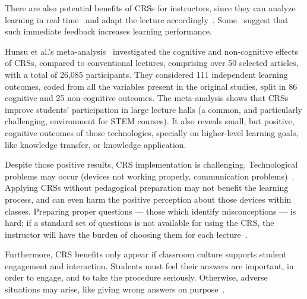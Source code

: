 There are also potential benefits of CRSs for instructors, since they can analyze learning in real time~\cite{yourstone2008classroom} and adapt the lecture accordingly~\cite{caldwell2007clickers, cutts2006practical}. Some~\cite{yourstone2008classroom, caldwell2007clickers} suggest that such immediate feedback increases learning performance.

Hunsu et al.'s meta-analysis~\cite{hunsu2016ARSeffect} investigated the cognitive and non-cognitive effects of CRSs, compared to conventional lectures, comprising over 50 selected articles, with a total of 26,085 participants. They considered 111 independent learning outcomes, coded from all the variables present in the original studies, split in 86 cognitive and 25 non-cognitive outcomes. The meta-analysis shows that CRSs improve students' participation in large lecture halls (a common, and particularly challenging, environment for STEM courses). It also reveals small, but positive, cognitive outcomes of those technologies, specially on higher-level learning goals, like knowledge transfer, or knowledge application.

Despite those positive results, CRS implementation is challenging. Technological problems may occur (devices not working properly, communication problems)~\cite{siau2006use}. Applying CRSs without pedagogical preparation may not benefit the learning process, and can even harm the positive perception about those devices within classes. Preparing proper questions --- those which identify misconceptions --- is hard; if a standard set of questions is not available for using the CRS, the instructor will have the burden of choosing them for each lecture~\cite{caldwell2007clickers}.

Furthermore, CRS benefits only appear if classroom culture supports student engagement and interaction. Students must feel their answers are important, in order to engage, and to take the procedure seriously. Otherwise, adverse situations may arise, like giving wrong answers on purpose~\cite{siau2006use}.



